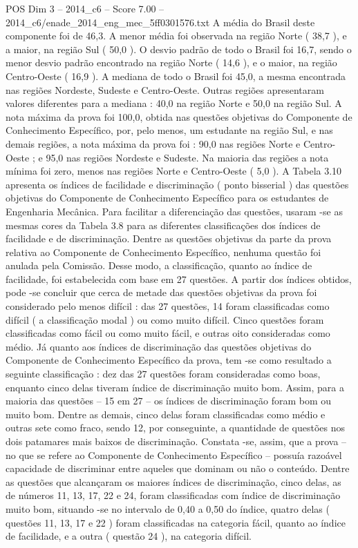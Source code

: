 \begin{textsample}{POS Dim 3 – 2014\_c6 – Score 7.00 – 2014\_c6/enade\_2014\_eng\_mec\_5ff0301576.txt}
A média do Brasil deste componente foi de 46,3.
A menor média foi observada na região Norte ( 38,7 ), e a maior, na região Sul ( 50,0 ).
O desvio padrão de todo o Brasil foi 16,7, sendo o menor desvio padrão encontrado na região Norte ( 14,6 ), e o maior, na região Centro-Oeste ( 16,9 ).
A mediana de todo o Brasil foi 45,0, a mesma encontrada nas regiões Nordeste, Sudeste e Centro-Oeste.
Outras regiões apresentaram valores diferentes para a mediana : 40,0 na região Norte e 50,0 na região Sul.
A nota máxima da prova foi 100,0, obtida nas questões objetivas do Componente de Conhecimento Específico, por, pelo menos, um estudante na região Sul, e nas demais regiões, a nota máxima da prova foi : 90,0 nas regiões Norte e Centro-Oeste ; e 95,0 nas regiões Nordeste e Sudeste.
Na maioria das regiões a nota mínima foi zero, menos nas regiões Norte e Centro-Oeste ( 5,0 ).
A Tabela 3.10 apresenta os índices de facilidade e discriminação ( ponto bisserial ) das questões objetivas do Componente de Conhecimento Específico para os estudantes de Engenharia Mecânica.
Para facilitar a diferenciação das questões, usaram -se as mesmas cores da Tabela 3.8 para as diferentes classificações dos índices de facilidade e de discriminação.
Dentre as questões objetivas da parte da prova relativa ao Componente de Conhecimento Específico, nenhuma questão foi anulada pela Comissão.
Desse modo, a classificação, quanto ao índice de facilidade, foi estabelecida com base em 27 questões.
A partir dos índices obtidos, pode -se concluir que cerca de metade das questões objetivas da prova foi considerado pelo menos difícil : das 27 questões, 14 foram classificadas como difícil ( a classificação modal ) ou como muito difícil.
Cinco questões foram classificadas como fácil ou como muito fácil, e outras oito consideradas como médio.
Já quanto aos índices de discriminação das questões objetivas do Componente de Conhecimento Específico da prova, tem -se como resultado a seguinte classificação : dez das 27 questões foram consideradas como boas, enquanto cinco delas tiveram índice de discriminação muito bom.
Assim, para a maioria das questões – 15 em 27 – os índices de discriminação foram bom ou muito bom.
Dentre as demais, cinco delas foram classificadas como médio e outras sete como fraco, sendo 12, por conseguinte, a quantidade de questões nos dois patamares mais baixos de discriminação.
Constata -se, assim, que a prova – no que se refere ao Componente de Conhecimento Específico – possuía razoável capacidade de discriminar entre aqueles que dominam ou não o conteúdo.
Dentre as questões que alcançaram os maiores índices de discriminação, cinco delas, as de números 11, 13, 17, 22 e 24, foram classificadas com índice de discriminação muito bom, situando -se no intervalo de 0,40 a 0,50 do índice, quatro delas ( questões 11, 13, 17 e 22 ) foram classificadas na categoria fácil, quanto ao índice de facilidade, e a outra ( questão 24 ), na categoria difícil.

\end{textsample}
